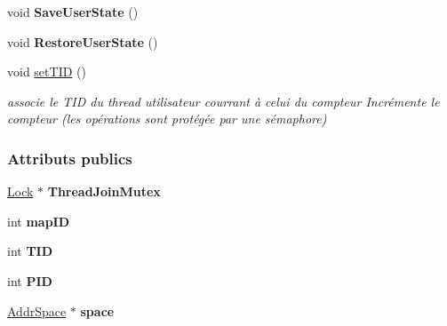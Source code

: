 \begin{DoxyCompactItemize}
\hypertarget{class_thread_abafd49d784372da5d051514ac3e21a4f}{}\label{class_thread_abafd49d784372da5d051514ac3e21a4f} 
void {\bfseries Save\+User\+State} ()
\item 
\hypertarget{class_thread_a3758b8a2903590f3a590ca10c2d477d5}{}\label{class_thread_a3758b8a2903590f3a590ca10c2d477d5} 
void {\bfseries Restore\+User\+State} ()
\item 
void \hyperlink{class_thread_a6208073ef0f52efa40eb5e813a191954}{set\+T\+ID} ()
\begin{DoxyCompactList}\small\item\em associe le T\+ID du thread utilisateur courrant à celui du compteur Incrémente le compteur (les opérations sont protégée par une sémaphore) \end{DoxyCompactList}\end{DoxyCompactItemize}
\subsubsection*{Attributs publics}
\begin{DoxyCompactItemize}
\item 
\hypertarget{class_thread_afcd6b50d2a4d35f1a9cf70e9769f4963}{}\label{class_thread_afcd6b50d2a4d35f1a9cf70e9769f4963} 
\hyperlink{class_lock}{Lock} $\ast$ {\bfseries Thread\+Join\+Mutex}
\item 
\hypertarget{class_thread_ab247c9c39f7e50a39abfcd2a86831e29}{}\label{class_thread_ab247c9c39f7e50a39abfcd2a86831e29} 
int {\bfseries map\+ID}
\item 
\hypertarget{class_thread_a5c76853f51d64bc8bb1eb2f6bfddf404}{}\label{class_thread_a5c76853f51d64bc8bb1eb2f6bfddf404} 
int {\bfseries T\+ID}
\item 
\hypertarget{class_thread_a41956ac61c6462788ff5ad6155c4b6c7}{}\label{class_thread_a41956ac61c6462788ff5ad6155c4b6c7} 
int {\bfseries P\+ID}
\item 
\hypertarget{class_thread_a6d69347555b57c5c25de4cec71e23fcf}{}\label{class_thread_a6d69347555b57c5c25de4cec71e23fcf} 
\hyperlink{class_addr_space}{Addr\+Space} $\ast$ {\bfseries space}
\end{DoxyCompactItemize}
